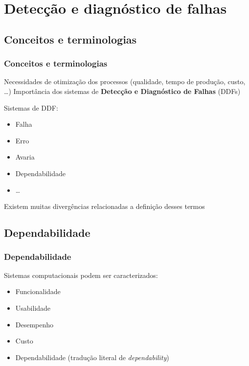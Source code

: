 \documentclass{beamer}
\begin{document}
\section{Detecção e diagnóstico de falhas}
\subsection{Conceitos e terminologias}
\begin{frame}
    \frametitle{Conceitos e terminologias}

    Necessidades de otimização dos processos (qualidade, tempo de produção,
    custo, \ldots) \implica Importância dos sistemas de {\bf Detecção e 
    Diagnóstico de Falhas} (DDFs)

    \vspace{0.25cm}
    
    Sistemas de DDF:

\begin{itemize}
    \item Falha
    \item Erro
    \item Avaria
    \item Dependabilidade
    \item \ldots
\end{itemize}

    Existem muitas divergências relacionadas a definição desses termos
\end{frame}

\subsection{Dependabilidade}
\begin{frame}
    \frametitle{Dependabilidade}

    Sistemas computacionais podem ser caracterizados:

\begin{itemize}
    \item Funcionalidade
    \item Usabilidade
    \item Desempenho
    \item Custo
    \item \alert{Dependabilidade} (tradução literal de {\it dependability})
\end{itemize}

\end{frame}
\end{document}
